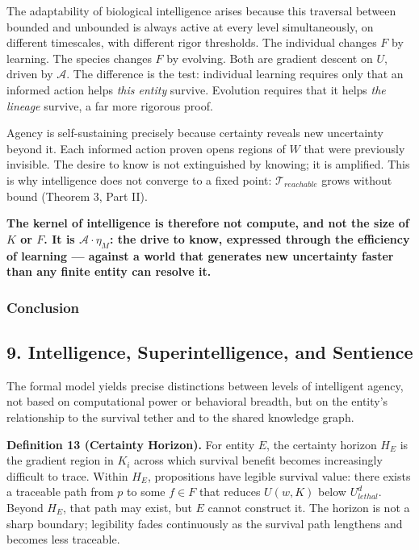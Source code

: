 \documentclass[
]{article}
\begin{document}
The adaptability of biological intelligence arises because this
traversal between bounded and unbounded is always active at every level
simultaneously, on different timescales, with different rigor
thresholds. The individual changes \(F\) by learning. The species
changes \(F\) by evolving. Both are gradient descent on \(U\), driven by
\(\mathcal{A}\). The difference is the test: individual learning
requires only that an informed action helps \emph{this entity} survive.
Evolution requires that it helps \emph{the lineage} survive, a far more
rigorous proof.

Agency is self-sustaining precisely because certainty reveals new
uncertainty beyond it. Each informed action proven opens regions of
\(W\) that were previously invisible. The desire to know is not
extinguished by knowing; it is amplified. This is why intelligence does
not converge to a fixed point: \(\mathcal{T}_{reachable}\) grows without
bound (Theorem 3, Part II).

\textbf{The kernel of intelligence is therefore not compute, and not the
size of \(K\) or \(F\). It is \(\mathcal{A} \cdot \eta_M\): the drive to
know, expressed through the efficiency of learning --- against a world
that generates new uncertainty faster than any finite entity can resolve
it.}

\subsubsection{Conclusion}\label{conclusion}

\subsection{9. Intelligence, Superintelligence, and
Sentience}\label{intelligence-superintelligence-and-sentience}

The formal model yields precise distinctions between levels of
intelligent agency, not based on computational power or behavioral
breadth, but on the entity's relationship to the survival tether and to
the shared knowledge graph.

\textbf{Definition 13 (Certainty Horizon).} For entity \(E\), the
certainty horizon \(H_E\) is the gradient region in \(K_i\) across which
survival benefit becomes increasingly difficult to trace. Within
\(H_E\), propositions have legible survival value: there exists a
traceable path from \(p\) to some \(f \in F\) that reduces \(U(w, K)\)
below \(U_{lethal}^d\). Beyond \(H_E\), that path may exist, but \(E\)
cannot construct it. The horizon is not a sharp boundary; legibility
fades continuously as the survival path lengthens and becomes less
traceable.
\end{document}
